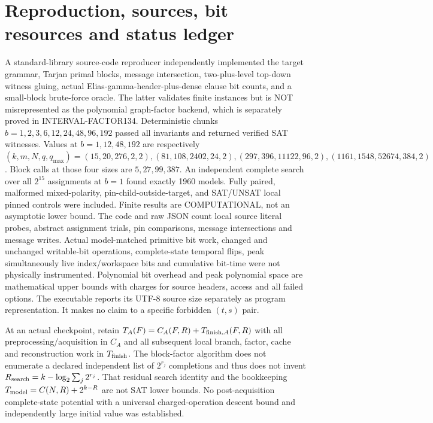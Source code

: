 \documentclass[11pt]{article}
\begin{document}
\section{Reproduction, sources, bit resources and status ledger}
A standard-library source-code reproducer independently implemented the target grammar, Tarjan primal blocks, message intersection, two-plus-level top-down witness gluing, actual Elias-gamma-header-plus-dense clause bit counts, and a small-block brute-force oracle. The latter validates finite instances but is NOT misrepresented as the polynomial graph-factor backend, which is separately proved in INTERVAL-FACTOR134. Deterministic chunks $b=1,2,3,6,12,24,48,96,192$ passed all invariants and returned verified SAT witnesses. Values at $b=1,12,48,192$ are respectively $(k,m,N,q,q_{\max})=(15,20,276,2,2),(81,108,2402,24,2),(297,396,11122,96,2),(1161,1548,52674,384,2)$. Block calls at those four sizes are $5,27,99,387$. An independent complete search over all $2^{15}$ assignments at $b=1$ found exactly 1960 models. Fully paired, malformed mixed-polarity, pin-child-outside-target, and SAT/UNSAT local pinned controls were included. Finite results are COMPUTATIONAL, not an asymptotic lower bound.
The code and raw JSON count local source literal probes, abstract assignment trials, pin comparisons, message intersections and message writes. Actual model-matched primitive bit work, changed and unchanged writable-bit operations, complete-state temporal flips, peak simultaneously live index/workspace bits and cumulative bit-time were not physically instrumented. Polynomial bit overhead and peak polynomial space are mathematical upper bounds with charges for source headers, access and all failed options. The executable reports its UTF-8 source size separately as program representation. It makes no claim to a specific forbidden $(t,s)$ pair.

At an actual checkpoint, retain $T_A(F)=C_A(F,R)+T_{{\rm finish},A}(F,R)$ with all preprocessing/acquisition in $C_A$ and all subsequent local branch, factor, cache and reconstruction work in $T_{\rm finish}$. The block-factor algorithm does not enumerate a declared independent list of $2^{r_j}$ completions and thus does not invent $R_{\rm search}=k-\log_2\sum_j2^{r_j}$. That residual search identity and the bookkeeping $T_{\rm model}=C(N,R)+2^{k-R}$ are not SAT lower bounds. No post-acquisition complete-state potential with a universal charged-operation descent bound and independently large initial value was established.
\end{document}

